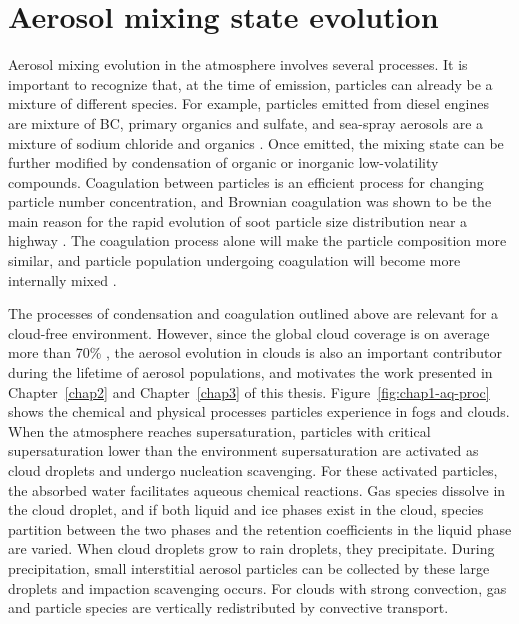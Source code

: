 \documentclass[edeposit,fullpage]{uiucthesis2009}
\begin{document}
\section{Aerosol mixing state evolution}  
Aerosol mixing evolution in the atmosphere involves several
processes. It is important to recognize that, at the time of emission,
particles can already be a mixture of different species. For example,
particles emitted from diesel engines are mixture of BC, primary
organics and sulfate, and sea-spray aerosols are a mixture of sodium
chloride and organics \citep{cheung2010emissions,
  kirpes2018secondary}. Once emitted, the mixing state can be further
modified by condensation of organic or inorganic low-volatility
compounds.
Coagulation between particles is an efficient process for changing
particle number concentration, and Brownian coagulation was shown to
be the main reason for the rapid evolution of soot particle size
distribution near a highway \citep{jacobson2004evolution}. The
coagulation process alone will make the particle composition more
similar, and particle population undergoing coagulation will become
more internally mixed \citep{Riemer2013a}.

The processes of condensation and coagulation outlined above are
relevant for a cloud-free environment. However, since the global cloud
coverage is on average more than 70\%
\citep{stubenrauch2013assessment}, the aerosol evolution in clouds is
also an important contributor during the lifetime of aerosol
populations, and motivates the work presented in Chapter~\ref{chap2}
and Chapter~\ref{chap3} of this thesis. Figure~\ref{fig:chap1-aq-proc}
shows the chemical and physical processes particles experience in fogs
and clouds. When the atmosphere reaches supersaturation, particles
with critical supersaturation lower than the environment
supersaturation are activated as cloud droplets and undergo nucleation
scavenging. For these activated particles, the absorbed water
facilitates aqueous chemical reactions. Gas species dissolve in the
cloud droplet, and if both liquid and ice phases exist in the cloud,
species partition between the two phases and the retention
coefficients in the liquid phase are varied. When cloud droplets grow
to rain droplets, they precipitate. During precipitation, small
interstitial aerosol particles can be collected by these large
droplets and impaction scavenging occurs. For clouds with strong
convection, gas and particle species are vertically redistributed by
convective transport.
\end{document}
